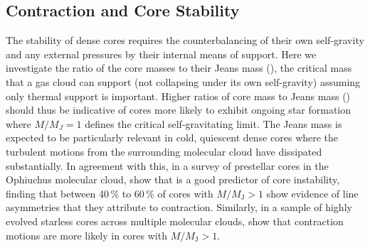 \documentclass[iop,twocolappendix]{emulateapj}
\begin{document}
\subsection{Contraction and Core Stability}
\label{subsec:stability}

The stability of dense cores requires the counterbalancing of their own self-gravity and any external pressures by their internal means of support. Here we investigate the ratio of the core masses to their Jeans mass (\MJ), the critical mass that a gas cloud can support (not collapsing under its own self-gravity) assuming only thermal support is important. Higher ratios of core mass to Jeans mass (\MMJ) should thus be indicative of cores more likely to exhibit ongoing star formation where $M/M_J=1$ defines the critical self-gravitating limit. The Jeans mass is expected to be particularly relevant in cold, quiescent dense cores where the turbulent motions from the surrounding molecular cloud have dissipated substantially. In agreement with this, in a survey of prestellar cores in the Ophiuchus molecular cloud, \citet{simpson11} show that {\MMJ} is a good predictor of core instability, finding that between 40\,\% to 60\,\% of cores with $M/M_\mathrm{J} > 1$ show evidence of line asymmetries that they attribute to contraction. Similarly, in a sample of highly evolved starless cores across multiple molecular clouds, \citet{Schnee2013} show that contraction motions are more likely in cores with $M/M_\mathrm{J} > 1$.
\end{document}
